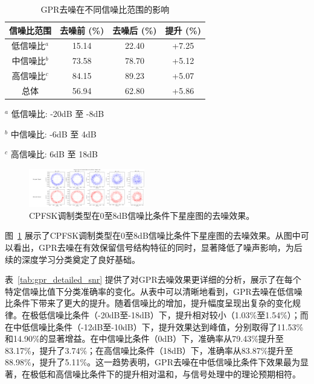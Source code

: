 \documentclass[conference]{IEEEtran}
\begin{document}
\begin{table}[!htbp]
\centering
\caption{GPR去噪在不同信噪比范围的影响}
\label{tab:gpr_impact}
\begin{threeparttable}
\begin{tabular}{@{}cccc@{}}
\toprule
信噪比范围 & 去噪前 (\%) & 去噪后 (\%) & 提升 (\%) \\
\midrule
低信噪比$^{a}$ & 15.14 & 22.40 & +7.25 \\
中信噪比$^{b}$ & 73.58 & 78.70 & +5.12 \\
高信噪比$^{c}$ & 84.15 & 89.23 & +5.07 \\
总体 & 56.94 & 62.80 & +5.86 \\
\bottomrule
\end{tabular}
\begin{tablenotes}
\footnotesize
\item[$^{a}$] 低信噪比: -20dB 至 -8dB
\item[$^{b}$] 中信噪比: -6dB 至 4dB  
\item[$^{c}$] 高信噪比: 6dB 至 18dB
\end{tablenotes}
\end{threeparttable}
\end{table}

\begin{figure}[htbp]
\centering
\includegraphics[width=0.45\textwidth]{figure/constellation_denoising.png}
\caption{CPFSK调制类型在0至8dB信噪比条件下星座图的去噪效果。}
\label{fig:constellation_denoising}
\end{figure}

图~\ref{fig:constellation_denoising} 展示了CPFSK调制类型在0至8dB信噪比条件下星座图的去噪效果。从图中可以看出，GPR去噪在有效保留信号结构特征的同时，显著降低了噪声影响，为后续的深度学习分类奠定了良好基础。

表~\ref{tab:gpr_detailed_snr} 提供了对GPR去噪效果更详细的分析，展示了在每个特定信噪比值下分类准确率的变化。从表中可以清晰地看到，GPR去噪在低信噪比条件下带来了更大的提升。随着信噪比的增加，提升幅度呈现出复杂的变化规律。在极低信噪比条件（-20dB至-18dB）下，提升相对较小（1.03\%至1.54\%）；而在中低信噪比条件（-12dB至-10dB）下，提升效果达到峰值，分别取得了11.53\%和14.90\%的显著增益。在中信噪比条件（0dB）下，准确率从79.43\%提升至83.17\%，提升了3.74\%；在高信噪比条件（18dB）下，准确率从83.87\%提升至88.98\%，提升了5.11\%。这一趋势表明，GPR去噪在中低信噪比条件下效果最为显著，在极低和高信噪比条件下的提升相对温和，与信号处理中的理论预期相符。
\end{document}
